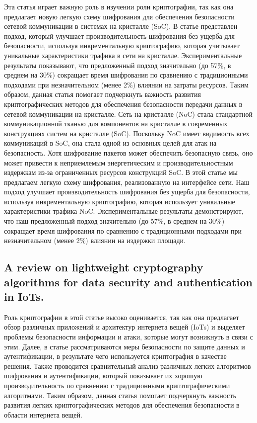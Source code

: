 \documentclass[14pt]{extarticle}
\begin{document}
Эта статья играет важную роль в изучении роли криптографии, так как она предлагает новую легкую схему шифрования для обеспечения безопасности сетевой коммуникации в системах на кристалле (SoC). В статье представлен подход, который улучшает производительность шифрования без ущерба для безопасности, используя инкрементальную криптографию, которая учитывает уникальные характеристики трафика в сети на кристалле. Экспериментальные результаты показывают, что предложенный подход значительно (до 57\%, в среднем на 30\%) сокращает время шифрования по сравнению с традиционными подходами при незначительном (менее 2\%) влиянии на затраты ресурсов. Таким образом, данная статья помогает подчеркнуть важность развития криптографических методов для обеспечения безопасности передачи данных в сетевой коммуникации на кристалле.
Сеть на кристалле (NoC) стала стандартной коммуникационной тканью для компонентов на кристалле в современных конструкциях систем на кристалле (SoC). Поскольку NoC имеет видимость всех коммуникаций в SoC, она стала одной из основных целей для атак на безопасность. Хотя шифрование пакетов может обеспечить безопасную связь, оно может привести к неприемлемым энергетическим и производительностным издержкам из-за ограниченных ресурсов конструкций SoC. В этой статье мы предлагаем легкую схему шифрования, реализованную на интерфейсе сети. Наш подход улучшает производительность шифрования без ущерба для безопасности, используя инкрементальную криптографию, которая использует уникальные характеристики трафика NoC. Экспериментальные результаты демонстрируют, что наш предложенный подход значительно (до 57\%, в среднем на 30\%) сокращает время шифрования по сравнению с традиционными подходами при незначительном (менее 2\%) влиянии на издержки площади.

\subsection{A review on lightweight cryptography algorithms for data security and authentication in IoTs.\cite{Article9}}

Роль криптографии в этой статье высоко оценивается, так как она предлагает обзор различных приложений и архитектур интернета вещей (IoTs) и выделяет проблемы безопасности информации и атаки, которые могут возникнуть в связи с этим. Далее, в статье рассматриваются меры безопасности по защите данных и аутентификации, в результате чего используется криптография в качестве решения. Также проводится сравнительный анализ различных легких алгоритмов шифрования и аутентификации, который показывает их хорошую производительность по сравнению с традиционными криптографическими алгоритмами. Таким образом, данная статья помогает подчеркнуть важность развития легких криптографических методов для обеспечения безопасности в области интернета вещей.
\end{document}
